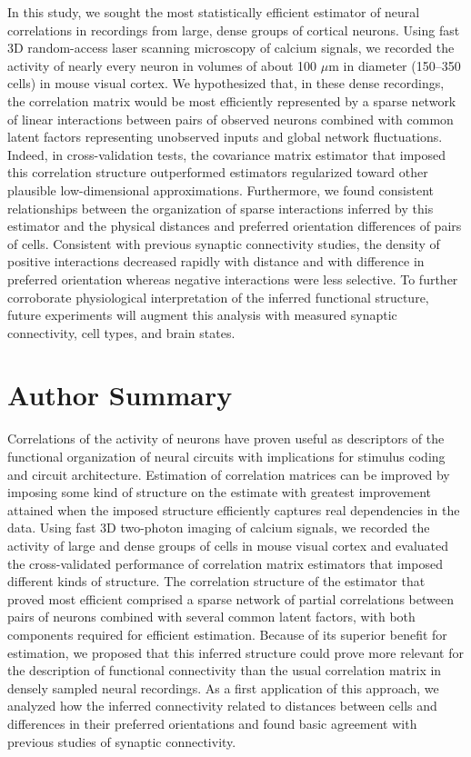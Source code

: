 \documentclass[10pt]{article}
\begin{document}
In this study, we sought the most statistically efficient estimator of neural correlations in recordings from large, dense groups of cortical neurons.  Using fast 3D random-access laser scanning microscopy of calcium signals, we recorded the activity of nearly every neuron in volumes of about 100 $\mu$m in diameter (150--350 cells) in mouse visual cortex.  We hypothesized that, in these dense recordings, the correlation matrix would be most efficiently represented by a sparse network of linear interactions between pairs of observed neurons combined with common latent factors representing unobserved inputs and global network fluctuations.  Indeed, in cross-validation tests, the covariance matrix estimator that imposed this correlation structure outperformed estimators regularized toward other plausible low-dimensional approximations. Furthermore, we found consistent relationships between the organization of sparse interactions inferred by this estimator and the physical distances and preferred orientation differences of pairs of cells.  Consistent with previous synaptic connectivity studies, the density of positive interactions decreased rapidly with distance and with difference in preferred orientation whereas negative interactions were less selective.  To further corroborate physiological interpretation of the inferred functional structure, future experiments will augment this analysis with measured synaptic connectivity, cell types, and brain states.


\section*{Author Summary}
Correlations of the activity of neurons have proven useful as descriptors of the functional organization of neural circuits with implications for stimulus coding and circuit architecture.  Estimation of correlation matrices can be improved by imposing some kind of structure on the estimate with greatest improvement attained when the imposed structure efficiently captures real dependencies in the data. Using fast 3D two-photon imaging of calcium signals, we recorded the activity of large and dense groups of cells in mouse visual cortex and evaluated the cross-validated performance of correlation matrix estimators that imposed different kinds of structure. The correlation structure of the estimator that proved most efficient comprised a sparse network of partial correlations between pairs of neurons combined with several common latent factors, with both components required for efficient estimation. Because of its superior benefit for estimation, we proposed that this inferred structure could prove more relevant for the description of functional connectivity than the usual correlation matrix in densely sampled neural recordings. As a first application of this approach, we analyzed how the inferred connectivity related to distances between cells and differences in their preferred orientations and found basic agreement with previous studies of synaptic connectivity.
\end{document}
